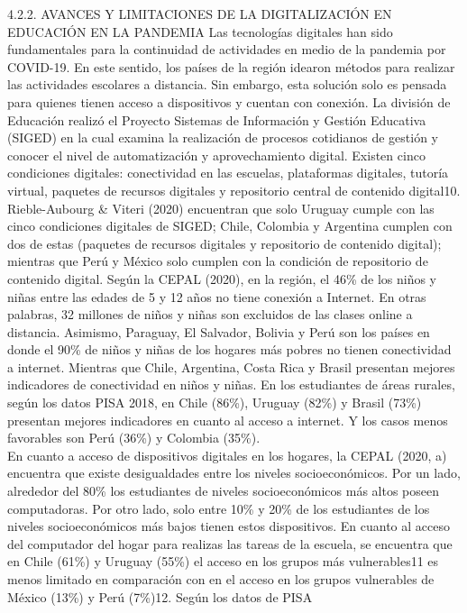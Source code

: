 4.2.2. AVANCES Y LIMITACIONES DE LA DIGITALIZACIÓN EN EDUCACIÓN EN LA
PANDEMIA Las tecnologías digitales han sido fundamentales para la
continuidad de actividades en medio de la pandemia por COVID-19. En este
sentido, los países de la región idearon métodos para realizar las
actividades escolares a distancia. Sin embargo, esta solución solo es
pensada para quienes tienen acceso a dispositivos y cuentan con
conexión. La división de Educación realizó el Proyecto Sistemas de
Información y Gestión Educativa (SIGED) en la cual examina la
realización de procesos cotidianos de gestión y conocer el nivel de
automatización y aprovechamiento digital. Existen cinco condiciones
digitales: conectividad en las escuelas, plataformas digitales, tutoría
virtual, paquetes de recursos digitales y repositorio central de
contenido digital10. Rieble-Aubourg \& Viteri (2020) encuentran que solo
Uruguay cumple con las cinco condiciones digitales de SIGED; Chile,
Colombia y Argentina cumplen con dos de estas (paquetes de recursos
digitales y repositorio de contenido digital); mientras que Perú y
México solo cumplen con la condición de repositorio de contenido
digital. Según la CEPAL (2020), en la región, el 46\% de los niños y
niñas entre las edades de 5 y 12 años no tiene conexión a Internet. En
otras palabras, 32 millones de niños y niñas son excluidos de las clases
online a distancia. Asimismo, Paraguay, El Salvador, Bolivia y Perú son
los países en donde el 90\% de niños y niñas de los hogares más pobres
no tienen conectividad a internet. Mientras que Chile, Argentina, Costa
Rica y Brasil presentan mejores indicadores de conectividad en niños y
niñas. En los estudiantes de áreas rurales, según los datos PISA 2018,
en Chile (86\%), Uruguay (82\%) y Brasil (73\%) presentan mejores
indicadores en cuanto al acceso a internet. Y los casos menos favorables
son Perú (36\%) y Colombia (35\%).\\
En cuanto a acceso de dispositivos digitales en los hogares, la CEPAL
(2020, a) encuentra que existe desigualdades entre los niveles
socioeconómicos. Por un lado, alrededor del 80\% los estudiantes de
niveles socioeconómicos más altos poseen computadoras. Por otro lado,
solo entre 10\% y 20\% de los estudiantes de los niveles socioeconómicos
más bajos tienen estos dispositivos. En cuanto al acceso del computador
del hogar para realizas las tareas de la escuela, se encuentra que en
Chile (61\%) y Uruguay (55\%) el acceso en los grupos más vulnerables11
es menos limitado en comparación con en el acceso en los grupos
vulnerables de México (13\%) y Perú (7\%)12. Según los datos de PISA
